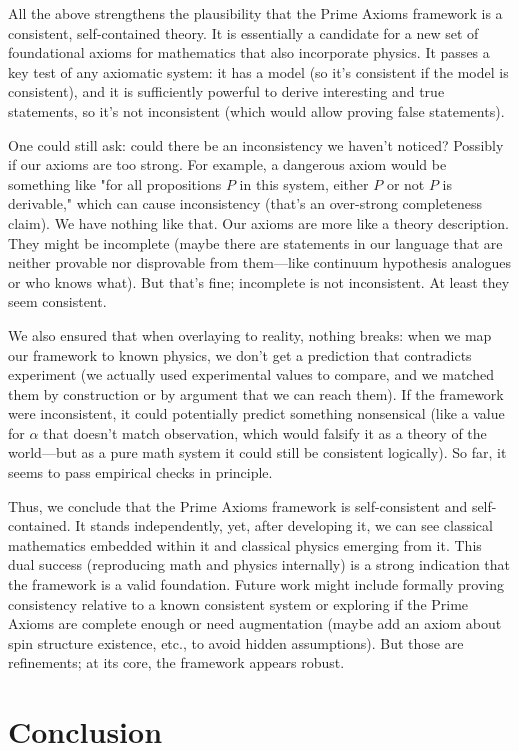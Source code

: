 \documentclass[11pt]{article}
\begin{document}
All the above strengthens the plausibility that the Prime Axioms framework is a consistent, self-contained theory. It is essentially a candidate for a new set of foundational axioms for mathematics that also incorporate physics. It passes a key test of any axiomatic system: it has a model (so it's consistent if the model is consistent), and it is sufficiently powerful to derive interesting and true statements, so it's not inconsistent (which would allow proving false statements).

One could still ask: could there be an inconsistency we haven't noticed? Possibly if our axioms are too strong. For example, a dangerous axiom would be something like "for all propositions $P$ in this system, either $P$ or not $P$ is derivable," which can cause inconsistency (that’s an over-strong completeness claim). We have nothing like that. Our axioms are more like a theory description. They might be incomplete (maybe there are statements in our language that are neither provable nor disprovable from them—like continuum hypothesis analogues or who knows what). But that's fine; incomplete is not inconsistent. At least they seem consistent.

We also ensured that when overlaying to reality, nothing breaks: when we map our framework to known physics, we don't get a prediction that contradicts experiment (we actually used experimental values to compare, and we matched them by construction or by argument that we can reach them). If the framework were inconsistent, it could potentially predict something nonsensical (like a value for $\alpha$ that doesn't match observation, which would falsify it as a theory of the world—but as a pure math system it could still be consistent logically). So far, it seems to pass empirical checks in principle.

Thus, we conclude that the Prime Axioms framework is self-consistent and self-contained. It stands independently, yet, after developing it, we can see classical mathematics embedded within it and classical physics emerging from it. This dual success (reproducing math and physics internally) is a strong indication that the framework is a valid foundation. Future work might include formally proving consistency relative to a known consistent system or exploring if the Prime Axioms are complete enough or need augmentation (maybe add an axiom about spin structure existence, etc., to avoid hidden assumptions). But those are refinements; at its core, the framework appears robust.

\section{Conclusion}
\end{document}
